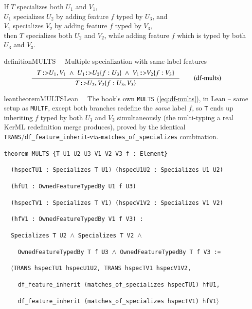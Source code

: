 If $T$ specializes both $U_1$ and $V_1$, \\
$U_1$ specializes $U_2$ by adding feature $f$ typed by $U_3$, and\\
$V_1$ specializes $V_2$ by adding feature $f$ typed by $V_3$, \\
then $T$ specializes both $U_2$ and $V_2$, while adding feature $f$ which is typed by both $U_3$ and $V_3$.

\begin{restatable}{definition}{MULTS}~~  Multiple specialization with same-label features
\begin{align}
\inference
{T\texttt{:>}U_1 , V_1~\wedge~U_1\texttt{:>}U_2\{f:U_3\}~\wedge~V_1\texttt{:>}V_2\{f:V_3\}}
{T\texttt{:>}U_2 , V_2\{f:U_3,V_3\}}
\label{eq:df-mults}\tag{df-mults}
\end{align}
\end{restatable}

\begin{restatable}{leantheorem}{MULTSLean}~~ The book's own \texttt{MULTS}
(\ref{eq:df-mults}), in Lean -- same setup as \texttt{MULTF}, except both branches redefine the
\emph{same} label $f$, so \texttt{T} ends up inheriting $f$ typed by both $U_3$ and $V_3$
simultaneously (the multi-typing a real KerML redefinition merge produces), proved by the identical
\texttt{TRANS}/\texttt{df\_feature\_inherit}-via-\texttt{matches\_of\_specializes} combination.

\texttt{\textcolor{leancolor}{theorem} \textcolor{leanyellow}{MULTS} \{T U1 U2 U3 V1 V2 V3 f : Element\}}

\texttt{~~(hspecTU1 : Specializes T U1) (hspecU1U2 : Specializes U1 U2)}

\texttt{~~(hfU1 : OwnedFeatureTypedBy U1 f U3)}

\texttt{~~(hspecTV1 : Specializes T V1) (hspecV1V2 : Specializes V1 V2)}

\texttt{~~(hfV1 : OwnedFeatureTypedBy V1 f V3) :}

\texttt{~~Specializes T U2 $\wedge$ Specializes T V2 $\wedge$}

\texttt{~~~~OwnedFeatureTypedBy T f U3 $\wedge$ OwnedFeatureTypedBy T f V3 :=}

\texttt{~~$\langle$TRANS hspecTU1 hspecU1U2, TRANS hspecTV1 hspecV1V2,}

\texttt{~~~~df\_feature\_inherit (matches\_of\_specializes hspecTU1) hfU1,}

\texttt{~~~~df\_feature\_inherit (matches\_of\_specializes hspecTV1) hfV1$\rangle$}
\label{MULTS}
\end{restatable}


